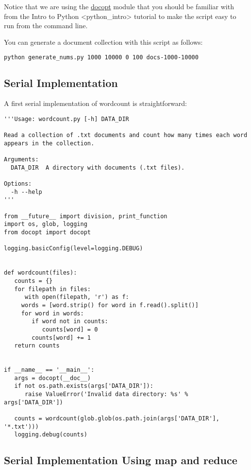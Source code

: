 Notice that we are using the
\href{https://pypi.python.org/pypi/docopt}{docopt} module that you
should be familiar with from the
Intro to Python \textless{}python\_intro\textgreater{} tutorial to make
the script easy to run from the command line.

You can generate a document collection with this script as follows:

\begin{lstlisting}
python generate_nums.py 1000 10000 0 100 docs-1000-10000
\end{lstlisting}

\subsection{Serial Implementation}

A first serial implementation of wordcount is straightforward:

\begin{lstlisting}
'''Usage: wordcount.py [-h] DATA_DIR

Read a collection of .txt documents and count how many times each word
appears in the collection.  

Arguments:
  DATA_DIR  A directory with documents (.txt files).

Options:
  -h --help
'''

from __future__ import division, print_function
import os, glob, logging
from docopt import docopt

logging.basicConfig(level=logging.DEBUG)


def wordcount(files):
   counts = {}
   for filepath in files:
      with open(filepath, 'r') as f:
     words = [word.strip() for word in f.read().split()]
     for word in words:
        if word not in counts:
           counts[word] = 0
        counts[word] += 1
   return counts


if __name__ == '__main__':
   args = docopt(__doc__)
   if not os.path.exists(args['DATA_DIR']):
      raise ValueError('Invalid data directory: %s' % args['DATA_DIR'])

   counts = wordcount(glob.glob(os.path.join(args['DATA_DIR'], '*.txt')))
   logging.debug(counts)
\end{lstlisting}

\subsection{Serial Implementation Using map and reduce}

